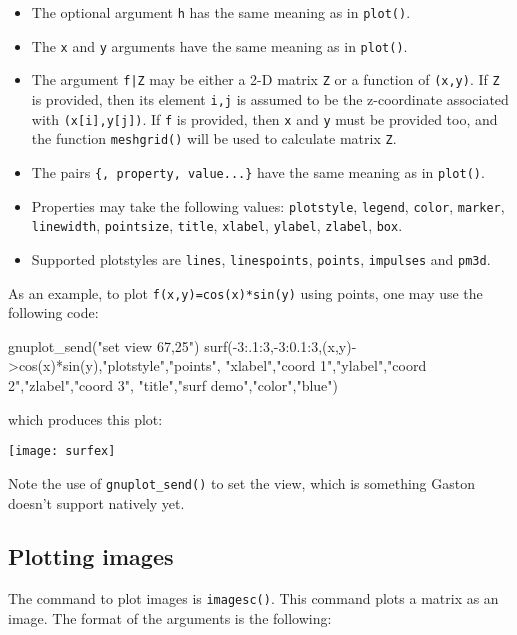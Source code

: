 \documentclass[11pt]{article}
\newcommand{\cmd}[1]{\texttt{#1}}
\begin{document}
\begin{itemize}
	\item The optional argument \cmd{h} has the same meaning as in
		\cmd{plot()}.
	\item The \cmd{x} and \cmd{y} arguments have the same meaning as in
		\cmd{plot()}.
	\item The argument \cmd{f|Z} may be either a 2-D matrix \cmd{Z} or a
		function of \cmd{(x,y)}. If \cmd{Z} is provided, then its element
		\cmd{i,j} is assumed to be the z-coordinate associated with
		\cmd{(x[i],y[j])}. If \cmd{f} is provided, then \cmd{x} and \cmd{y} must
		be provided too, and the function \cmd{meshgrid()} will be used to
		calculate matrix \cmd{Z}.
	\item The pairs \cmd{\{, property, value...\}} have the same meaning as in
		\cmd{plot()}.
	\item Properties may take the following values: \cmd{plotstyle},
		\cmd{legend}, \cmd{color}, \cmd{marker}, \cmd{linewidth},
		\cmd{pointsize}, \cmd{title}, \cmd{xlabel}, \cmd{ylabel}, \cmd{zlabel},
		\cmd{box}.
	\item Supported plotstyles are \cmd{lines}, \cmd{linespoints},
		\cmd{points}, \cmd{impulses} and \cmd{pm3d}.
\end{itemize}

As an example, to plot \cmd{f(x,y)=cos(x)*sin(y)} using points, one may use the
following code:

\begin{juliacode}
gnuplot_send("set view 67,25")
surf(-3:.1:3,-3:0.1:3,(x,y)->cos(x)*sin(y),"plotstyle","points",
"xlabel","coord 1","ylabel","coord 2","zlabel","coord 3",
"title","surf demo","color","blue")
\end{juliacode}

\noindent which produces this plot:

\begin{center}
\texttt{[image: surfex]}
\end{center}

Note the use of \cmd{gnuplot\_send()} to set the view, which is something Gaston
doesn't support natively yet.

\subsection{Plotting images}

The command to plot images is \cmd{imagesc()}. This command plots a matrix as an
image. The format of the arguments is the following:
\end{document}
